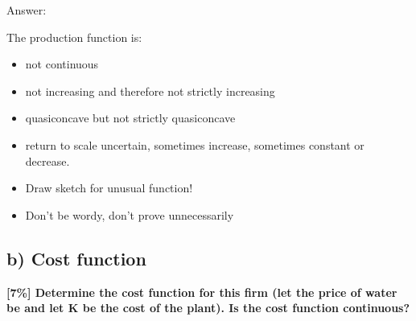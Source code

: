 \documentclass{article}
\begin{document}
Answer:

The production function is:
\begin{itemize}
\item not continuous
\item not increasing and therefore not strictly increasing
\item quasiconcave but not strictly quasiconcave
\item return to scale uncertain, sometimes increase, sometimes constant or decrease.
\end{itemize}


\begin{mdframed}[backgroundcolor=yellow!20,linecolor=white]
\begin{itemize}
\item Draw sketch for unusual function!
\item Don't be wordy, don't prove unnecessarily 
\end{itemize}
\end{mdframed}

\subsection{b) Cost function}

\textbf{[7\%] Determine the cost function for this firm (let the price of
water be and let K be the cost of the plant). Is the cost function
continuous?}
\end{document}
